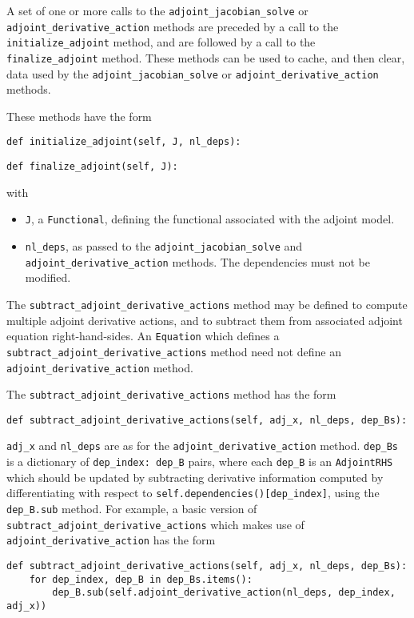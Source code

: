\documentclass[11pt]{article}
\begin{document}
A set of one or more calls to the \texttt{adjoint\_jacobian\_solve} or
\texttt{adjoint\_derivative\_action} methods are preceded by a call to the
\texttt{initialize\_adjoint} method, and are followed by a call to the
\texttt{finalize\_adjoint} method. These methods can be used to cache, and then
clear, data used by the \texttt{adjoint\_jacobian\_solve} or 
\texttt{adjoint\_derivative\_action} methods.

These methods have the form
\begin{lstlisting}
def initialize_adjoint(self, J, nl_deps):
\end{lstlisting}
\begin{lstlisting}
def finalize_adjoint(self, J):
\end{lstlisting}
with
\begin{itemize}
    \item \texttt{J}, a \texttt{Functional}, defining the functional
      associated with the adjoint model.
    \item \texttt{nl\_deps}, as passed to the \texttt{adjoint\_jacobian\_solve}
      and \texttt{adjoint\_derivative\_action} methods. The dependencies must
      not be modified.
\end{itemize}

The \texttt{subtract\_adjoint\_derivative\_actions} method may be defined to
compute multiple adjoint derivative actions, and to subtract them from
associated adjoint equation right-hand-sides. An \texttt{Equation} which
defines a \texttt{subtract\_adjoint\_derivative\_actions} method need not
define an \texttt{adjoint\_derivative\_action} method.

The \texttt{subtract\_adjoint\_derivative\_actions} method has the form
\begin{lstlisting}
def subtract_adjoint_derivative_actions(self, adj_x, nl_deps, dep_Bs):
\end{lstlisting}
\texttt{adj\_x} and \texttt{nl\_deps} are as for the
\texttt{adjoint\_derivative\_action} method. \texttt{dep\_Bs} is a dictionary
of \texttt{dep\_index: dep\_B} pairs, where each \texttt{dep\_B} is an
\texttt{AdjointRHS} which should be updated by subtracting derivative
information computed by differentiating with respect to
\texttt{self.dependencies()[dep\_index]}, using the \texttt{dep\_B.sub} method.
For example, a basic version of \texttt{subtract\_adjoint\_derivative\_actions}
which makes use of \texttt{adjoint\_derivative\_action} has the form
\begin{lstlisting}
def subtract_adjoint_derivative_actions(self, adj_x, nl_deps, dep_Bs):
    for dep_index, dep_B in dep_Bs.items():
        dep_B.sub(self.adjoint_derivative_action(nl_deps, dep_index, adj_x))
\end{lstlisting}
\end{document}
